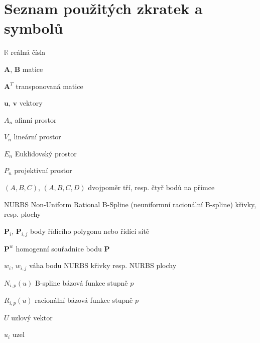 
\chapter*{Seznam použitých zkratek a symbolů}
\symbolsize=3.5cm%
\begin{symboly}
%
%
%
%
%
%
\item[$\mathbb{R}$] reálná čísla
\item[$\mathbf{A}$, $\mathbf{B}$] matice
\item[$\mathbf{A}^T$] transponovaná matice
\item[$\mathbf{u}$, $\mathbf{v}$] vektory
\item[$A_n$] afinní prostor
\item[$V_n$] lineární prostor
\item[$E_n$] Euklidovský prostor
\item[$P_n$] projektivní prostor
\item[$(A,B,C)$, $(A,B,C,D)$] dvojpoměr tří, resp. čtyř bodů na přímce
\item[NURBS] Non-Uniform Rational B-Spline (neuniformní racionální B-spline) křivky, resp. plochy
\item[$\mathbf{P}_i$, $\mathbf{P}_{i,j}$] body řídícího polygonu nebo řídící sítě
\item[$\mathbf{P}^w$] homogenní souřadnice bodu $\mathbf{P}$
\item[$w_i$, $w_{i,j}$] váha bodu NURBS křivky resp. NURBS plochy
\item[$N_{i,p}(u)$] B-spline bázová funkce stupně $p$
\item[$R_{i,p}(u)$] racionální bázová funkce stupně $p$

\item[$U$] uzlový vektor
\item[$u_i$] uzel


\end{symboly}
